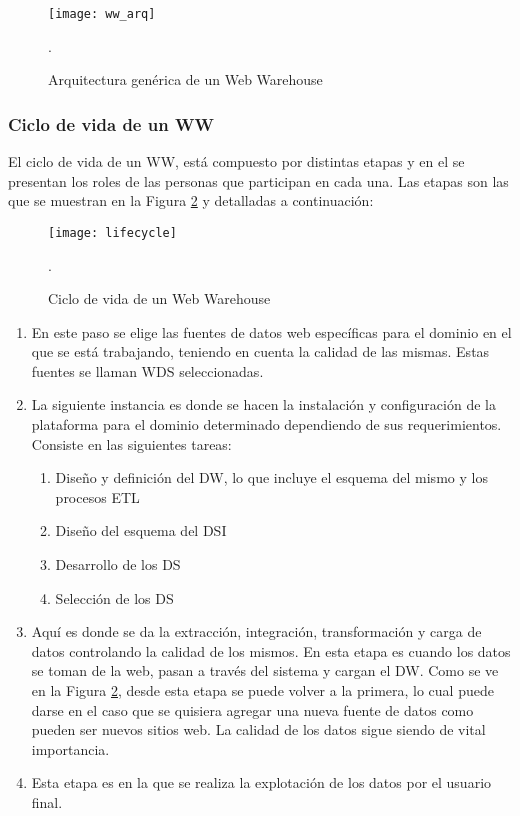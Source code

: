 \documentclass[a4paper,11pt]{article}
\begin{document}
    \begin{figure}[!htb]
      \begin{center}
        \texttt{[image: ww\_arq]}
        \caption{Arquitectura genérica de un Web Warehouse} \cite[p.~2]{webwarehouse}.
        \label{ww_arq}
      \end{center}
    \end{figure}
    
    
    \subsubsection{Ciclo de vida de un WW}
    
    El ciclo de vida de un WW, está compuesto por distintas etapas y en el se presentan los roles de las personas que participan en cada una. Las
    etapas son las que se muestran en la Figura \ref{lifecycle} y detalladas a continuación:
    
    \begin{figure}[!htb]
      \begin{center}
        \texttt{[image: lifecycle]}
        \caption{Ciclo de vida de un Web Warehouse} \cite[p.~3]{webwarehouse}.
        \label{lifecycle}
      \end{center}
    \end{figure}
    
    \begin{enumerate}
      \item En este paso se elige las fuentes de datos web específicas para el dominio en el que se está trabajando, teniendo en cuenta la calidad de las mismas.
      Estas fuentes se llaman WDS seleccionadas.
      \item La siguiente instancia es donde se hacen la instalación y configuración de la plataforma para el dominio determinado dependiendo de sus
      requerimientos. Consiste en las siguientes tareas:
        \begin{enumerate}
          \item Diseño y definición del DW, lo que incluye el esquema del mismo y los procesos ETL
          \item Diseño del esquema del DSI
          \item Desarrollo de los DS
          \item Selección de los DS
        \end{enumerate}
      \item Aquí es donde se da la extracción, integración, transformación y carga de datos controlando la calidad de los mismos. En esta etapa es cuando los
      datos se toman de la web, pasan a través del sistema y cargan el DW. Como se ve en la Figura \ref{lifecycle}, desde esta etapa se puede volver a la
      primera, lo cual puede darse en el caso que se quisiera agregar una nueva fuente de datos como pueden ser nuevos sitios web. La calidad de los datos sigue
      siendo de vital importancia.
      \item Esta etapa es en la que se realiza la explotación de los datos por el usuario final.
    \end{enumerate}
    
\end{document}
